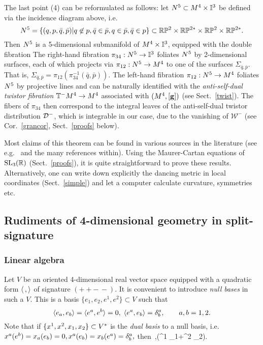 \begin{rmrk} The last  point (4) can be reformulated as follows: let $N^5\subset  M^4\times{\mathbb I^3}$ be defined via the incidence diagram above, i.e.
$$N^5=\{(q,p,\bar q, \bar p)| q\not\in p, \bar q\in\bar  p, q\in\bar p, \bar q\in  p\}\subset\mathbb{R}\mathbb{P}^2\times \mathbb{R}\mathbb{P}^{2*}\times\mathbb{R}\mathbb{P}^2\times \mathbb{R}\mathbb{P}^{2*}.$$ 
%
Then $N^5$ is a 5-dimensional submanifold of $M^4\times {\mathbb I^3} $, equipped with the  double fibration
%
\be\label{double}    
\ee
%
The right-hand fibration $\pi_{34}:N^5\to{\mathbb I^3}$ foliates $N^5$ by 2-dimensional surfaces, each of which projects via $\pi_{12}:N^5\to M^4$
to one of the surfaces  $\Sigma_{\bar q, \bar p}$. That is, $\Sigma_{\bar q, \bar p}=\pi_{12}\left(\pi_{34}^{-1}(\bar q, \bar p)\right).$ The left-hand fibration $\pi_{12}:N^5\to M^4$ foliates $N^5$  by projective lines and  can be naturally identified with the {\em anti-self-dual twistor fibration} $\mathbb{T}^-M^4\to M^4$ associated with $(M^4,[\mathbf{ g}])$ (see Sect.~\ref{twist}). The fibers of $\pi_{34}$ then correspond to the integral  leaves of the anti-self-dual twistor distribution ${\mathcal D}^-$, which is integrable in our case, due to the vanishing of $\mathcal W^-$ (see Cor.~\ref{grancor}, Sect.~\ref{proofs}  below).  
\end{rmrk}

 Most claims of this theorem can be found in  various sources in the literature (see e.g.~\cite{A} and the many references within). Using  the Maurer-Cartan equations of ${\mathrm{SL}_3(\mathbb{R})}$ (Sect.~\ref{proofs}), it is quite straightforward to prove these results. Alternatively, one can write down explicitly the dancing metric  in local coordinates (Sect.~\ref{simple}) and let a computer calculate curvature, symmetries etc. 

\subsection{Rudiments of 4-dimensional geometry in split-signature}
\subsubsection{Linear algebra}\label{linalg}  

Let  $V$ be  an oriented 4-dimensional real vector space equipped  with  a quadratic form $\langle\,,\rangle$
 of signature $(++-\,-)$. It is convenient to introduce  {\em null bases} in such a $V$. This is a basis $\{e_1, e_2, e^1, e^2\}\subset V$  
such that 
$$\langle e_a, e_b\rangle=\langle e^a, e^b\rangle=0, \;  \langle e^a, e_b\rangle=\delta^a_b, \qquad a,b=1,2.$$ 
%
Note that if $\{x^1, x^2,  x_1,  x_2 \}\subset V^*$ is the {\em dual basis} to a null basis, i.e. $x^a(e^b)=x_a(e_b)=0,  
x^a(e_b)=x_b(e^a)=\delta^a_b,$ then 
\be\label{metric}\<\,,(\ed^1 \ed_1+\ed^2 \ed_2).
\ee

